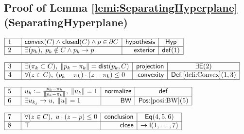 \documentclass[11pt,reqno]{amsart}
\begin{document}
	\subsection*{Proof of Lemma \protect\ref{lemi:SeparatingHyperplane} (\textsf{SeparatingHyperplane})}
	\noindent$\begin{array}{|m{0.5cm}|l|r|c|}
	\hline
	1 & \mathsf{convex}(C)\wedge\mathsf{closed}(C)\wedge p\in\partial C & \mathsf{hypothesis} & \mathsf{Hyp} \\ \hline
	2 & \exists(p_{k}),\;p_{k}\notin C\wedge p_{k}\to p & \mathsf{exterior} & \mathsf{def}(1) \\ \hline
	\end{array}$
	\par\nointerlineskip\noindent$\begin{array}{|m{0.5cm}|l|r|c|}
	\hline
	3 & \exists(\pi_{k}\subset C),\;\|p_{k}-\pi_{k}\|=\mathsf{dist}(p_{k},C) & \mathsf{projection} & \exists\mathsf{E}(2) \\ \hline
	4 & \forall(z\in C),\;(p_{k}-\pi_{k})\cdot(z-\pi_{k})\le0 & \mathsf{convexity} & \textsf{Def:}\ref{defi:Convex}(1,3) \\ \hline
	\end{array}$
	\par\nointerlineskip\noindent$\begin{array}{|m{0.5cm}|l|r|c|}
	\hline
	5 & u_{k}:=\tfrac{p_{k}-\pi_{k}}{\|p_{k}-\pi_{k}\|},\;\|u_{k}\|=1 & \mathsf{normalize} & \mathsf{def} \\ \hline
	6 & \exists u_{k_{j}}\to u,\;\|u\|=1 & \mathsf{BW} & \textsf{Pos:}\ref{posi:BW}(5) \\ \hline
	\end{array}$
	\par\nointerlineskip\noindent$\begin{array}{|m{0.5cm}|l|r|c|}
	\hline
	7 & \forall(z\in C),\;u\cdot(z-p)\le0 & \mathsf{conclusion} & \mathsf{Eq}(4,5,6) \\ \hline
	8 & \top & \mathsf{close} & \to\mathsf{I}(1,\dots,7) \\ \hline
	\end{array}$
	\medskip
	
\end{document}
